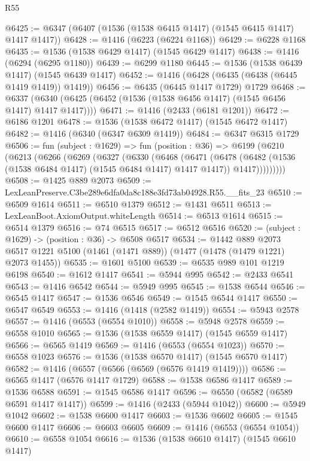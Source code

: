 \begin{lexlean}{R55}
\begin{coremodule}
{{@6425 := @6347 (@6407 (@1536 (@1538 @6415 @1417) (@1545 @6415 @1417) @1417 @1417))
@6428 := @1416 (@6223 (@6224 @1168))
@6429 := @6228 @1168
@6435 := @1536 (@1538 @6429 @1417) (@1545 @6429 @1417)
@6438 := @1416 (@6294 (@6295 @1180))
@6439 := @6299 @1180
@6445 := @1536 (@1538 @6439 @1417) (@1545 @6439 @1417)
@6452 := @1416 (@6428 (@6435 (@6438 (@6445 @1419 @1419)) @1419))
@6456 := @6435 (@6445 @1417 @1729) @1729
@6468 := @6337 (@6340 (@6425 (@6452 (@1536 (@1538 @6456 @1417) (@1545 @6456 @1417) @1417 @1417))))
@6471 := @1416 (@2433 (@6181 @1201))
@6472 := @6186 @1201
@6478 := @1536 (@1538 @6472 @1417) (@1545 @6472 @1417)
@6482 := @1416 (@6340 (@6347 @6309 @1419))
@6484 := @6347 @6315 @1729
@6506 := fun (subject : @1629) =>
  fun (position : @36) =>
  @6199
    (@6210
      (@6213
        (@6266
          (@6269
            (@6327
              (@6330
                (@6468
                  (@6471
                    (@6478
                      (@6482 (@1536 (@1538 @6484 @1417) (@1545 @6484 @1417) @1417 @1417))
                      @1417)))))))))
@6508 := @1425 @889 @2073
@6509 := LexLeanPreserve.C3be289e6dfa0da8c188e3fd73ab04928.R55.__fits_23
@6510 := @6509 @1614
@6511 := @6510 @1379
@6512 := @1431 @6511
@6513 := LexLeanBoot.AxiomOutput.whiteLength
@6514 := @6513 @1614
@6515 := @6514 @1379
@6516 := @74 @6515
@6517 := @6512 @6516
@6520 := (subject : @1629) -> (position : @36) -> @6508 @6517
@6534 := @1442
    @889
    @2073
    @6517
    @1221
    @5100
    (@1461 (@1471 @889))
    (@1477 (@1478 (@1479 @1221) @2073 @1455))
@6535 := @1601 @5100
@6539 := @6535 @989 @101 @1219 @6198
@6540 := @1612 @1417
@6541 := @5944 @995
@6542 := @2433 @6541
@6543 := @1416 @6542
@6544 := @5949 @995
@6545 := @1538 @6544
@6546 := @6545 @1417
@6547 := @1536 @6546
@6549 := @1545 @6544 @1417
@6550 := @6547 @6549
@6553 := @1416 (@1418 (@2582 @1419))
@6554 := @5943 @2578
@6557 := @1416 (@6553 (@6554 @1010))
@6558 := @5948 @2578
@6559 := @6558 @1010
@6565 := @1536 (@1538 @6559 @1417) (@1545 @6559 @1417)
@6566 := @6565 @1419
@6569 := @1416 (@6553 (@6554 @1023))
@6570 := @6558 @1023
@6576 := @1536 (@1538 @6570 @1417) (@1545 @6570 @1417)
@6582 := @1416 (@6557 (@6566 (@6569 (@6576 @1419 @1419))))
@6586 := @6565 @1417 (@6576 @1417 @1729)
@6588 := @1538 @6586 @1417
@6589 := @1536 @6588
@6591 := @1545 @6586 @1417
@6596 := @6550 (@6582 (@6589 @6591 @1417 @1417))
@6599 := @1416 (@2433 (@5944 @1042))
@6600 := @5949 @1042
@6602 := @1538 @6600 @1417
@6603 := @1536 @6602
@6605 := @1545 @6600 @1417
@6606 := @6603 @6605
@6609 := @1416 (@6553 (@6554 @1054))
@6610 := @6558 @1054
@6616 := @1536 (@1538 @6610 @1417) (@1545 @6610 @1417)
}}
\end{coremodule}
\end{lexlean}
